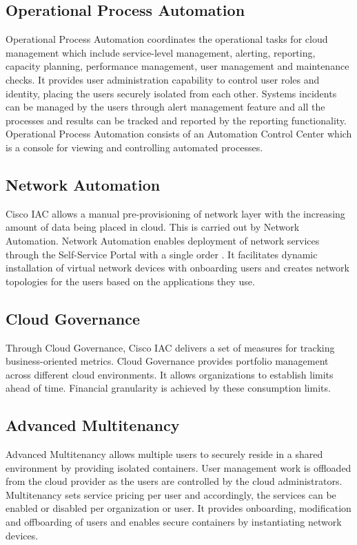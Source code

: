 \documentclass[9pt,twocolumn,twoside]{../../styles/osajnl}
\begin{document}
\subsection{Operational Process Automation}

Operational Process Automation coordinates the operational tasks for
cloud management which include service-level management, alerting,
reporting, capacity planning, performance management, user management
and maintenance checks. It provides user administration capability to
control user roles and identity, placing the users securely isolated
from each other. Systems incidents can be managed by the users through
alert management feature and all the processes and results can be
tracked and reported by the reporting functionality. Operational
Process Automation consists of an Automation Control Center which is a
console for viewing and controlling automated processes.

\subsection{Network Automation}

Cisco IAC allows a manual pre-provisioning of network layer with the
increasing amount of data being placed in cloud. This is carried out
by Network Automation. Network Automation enables deployment of
network services through the Self-Service Portal with a single order
\cite{cisco-mondora}. It facilitates dynamic installation of virtual
network devices with onboarding users and creates network topologies
for the users based on the applications they use.

\subsection{Cloud Governance}

Through Cloud Governance, Cisco IAC delivers a set of measures for
tracking business-oriented metrics. Cloud Governance provides
portfolio management across different cloud environments. It allows
organizations to establish limits ahead of time. Financial granularity
is achieved by these consumption limits.

\subsection{Advanced Multitenancy}

Advanced Multitenancy allows multiple users to securely reside in a
shared environment by providing isolated containers. User management
work is offloaded from the cloud provider as the users are controlled
by the cloud administrators. Multitenancy sets service pricing per
user and accordingly, the services can be enabled or disabled per
organization or user. It provides onboarding, modification and
offboarding of users and enables secure containers by instantiating
network devices.
\end{document}
